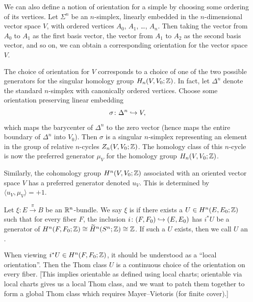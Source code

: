 \begin{node}
We can also define a notion of orientation for a simple by choosing
some ordering of its vertices. Let $\Sigma^{n}$ be an $n$-simplex,
linearly embedded in the $n$-dimensional vector space $V$, with
ordered vertices $A_{0}$, $A_{1}$, \dots, $A_{n}$. Then taking the
vector from $A_{0}$ to $A_{1}$ as the first basis vector, the vector
from $A_{1}$ to $A_{2}$ as the second basis vector, and so on, we can
obtain a corresponding orientation for the vector space $V$.
\end{node}

\begin{remark}
The choice of orientation for $V$ corresponds to a choice of one of
the two possible generators for the singular homology group $H_{n}(V,V_{0};\mathbb{Z})$.
In fact, let $\Delta^{n}$ denote the standard $n$-simplex with
canonically ordered vertices. Choose some orientation preserving
linear embedding
\begin{equation}
\sigma\colon\Delta^{n}\hookrightarrow V,
\end{equation}
which maps the barycenter of $\Delta^{n}$ to the zero vector (hence
maps the entire boundary of $\Delta^{n}$ into $V_{0}$). Then $\sigma$
is a singular $n$-simplex representing an element in the group of
relative $n$-cycles $Z_{n}(V,V_{0};\mathbb{Z})$. The homology class of this
$n$-cycle is now the preferred generator $\mu_{V}$ for the homology
group $H_{n}(V,V_{0};\mathbb{Z})$.

Similarly, the cohomology group $H^{n}(V,V_{0};\mathbb{Z})$ associated with
an oriented vector space $V$ has a preferred generator denoted
$u_{V}$. This is determined by $\langle u_{V},\mu_{V}\rangle=+1$.
\end{remark}

\begin{definition}
Let $\xi\colon E\xrightarrow{\pi}B$ be an $\mathbb{R}^{n}$-bundle. We say
$\xi$ is  if there exists a $U\in H^{n}(E,E_{0};\mathbb{Z})$
such that for every fiber $F$, the inclusion $i\colon(F,F_{0})\hookrightarrow(E,E_{0})$
has $i^{*}U$ be a generator of $H^{n}(F,F_{0};\mathbb{Z})\cong\widetilde{H}^{n}(S^{n};\mathbb{Z})\cong\mathbb{Z}$.
If such a $U$ exists, then we call $U$ an .
\end{definition}

\begin{remark}
When viewing $i^{*}U\in H^{n}(F,F_{0};\mathbb{Z})$, it should be understood
as a ``local orientation''. Then the Thom class $U$ is a continuous
choice of the orientation on every fiber. [This implies orientable as
  defined using local charts; orientable via local charts gives us a
  local Thom class, and we want to patch them together to form a
  global Thom class which requires Mayer--Vietoris (for finite cover).] 
\end{remark}

